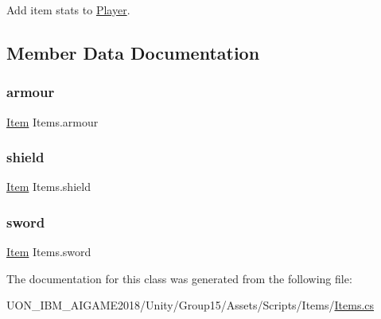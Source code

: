 Add item stats to \mbox{\hyperlink{class_player}{Player}}. 



\subsection{Member Data Documentation}
\mbox{\label{class_items_ad59621b7b465ccd957cf06dde55279dd}} 
\subsubsection{\texorpdfstring{armour}{armour}}
{\footnotesize\ttfamily \mbox{\hyperlink{class_item}{Item}} Items.\+armour}

\mbox{\label{class_items_a7e6e791cf22f41a685dd2092105a81b1}} 
\subsubsection{\texorpdfstring{shield}{shield}}
{\footnotesize\ttfamily \mbox{\hyperlink{class_item}{Item}} Items.\+shield}

\mbox{\label{class_items_a2ee0fd7e676f594e6e184b56b7f1c958}} 
\subsubsection{\texorpdfstring{sword}{sword}}
{\footnotesize\ttfamily \mbox{\hyperlink{class_item}{Item}} Items.\+sword}



The documentation for this class was generated from the following file\+:\begin{DoxyCompactItemize}
\item 
U\+O\+N\+\_\+\+I\+B\+M\+\_\+\+A\+I\+G\+A\+M\+E2018/\+Unity/\+Group15/\+Assets/\+Scripts/\+Items/\mbox{\hyperlink{_items_8cs}{Items.\+cs}}\end{DoxyCompactItemize}
